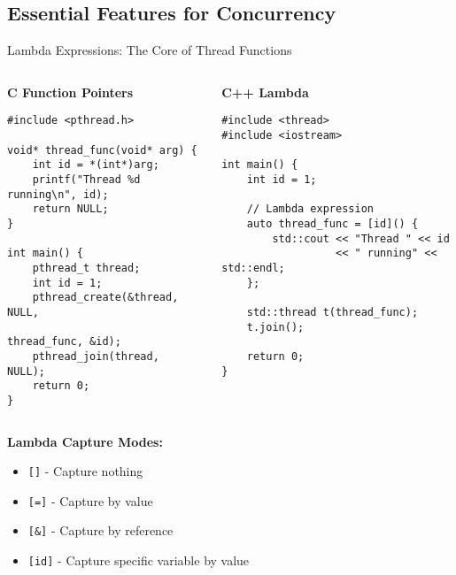 \subsection{Essential Features for Concurrency}
\begin{frame}[fragile]{ Lambda Expressions: The Core of Thread Functions}
	\begin{columns}
		\begin{column}{0.5\textwidth}
			\textbf{C Function Pointers}
			\begin{verbatim}
#include <pthread.h>

void* thread_func(void* arg) {
    int id = *(int*)arg;
    printf("Thread %d running\n", id);
    return NULL;
}

int main() {
    pthread_t thread;
    int id = 1;
    pthread_create(&thread, NULL,
                   thread_func, &id);
    pthread_join(thread, NULL);
    return 0;
}
			\end{verbatim}
		\end{column}
		\begin{column}{0.5\textwidth}
			\textbf{C++ Lambda}
			\begin{verbatim}
#include <thread>
#include <iostream>

int main() {
    int id = 1;

    // Lambda expression
    auto thread_func = [id]() {
        std::cout << "Thread " << id
                  << " running" << std::endl;
    };

    std::thread t(thread_func);
    t.join();

    return 0;
}
			\end{verbatim}
		\end{column}
	\end{columns}

	\vspace{0.5em}
	\textbf{Lambda Capture Modes:}
	\begin{itemize}
		\item \texttt{[]} - Capture nothing
		\item \texttt{[=]} - Capture by value
		\item \texttt{[\&]} - Capture by reference
		\item \texttt{[id]} - Capture specific variable by value
	\end{itemize}
\end{frame}

